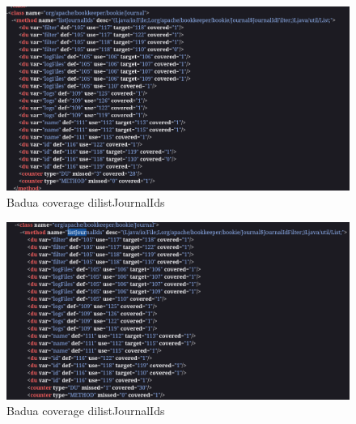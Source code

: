 \documentclass[12pt, a4paper]{article}
\begin{document}
  \begin{figure}
    \includegraphics[width=\linewidth]{./images/BaduaCoveragelistJournalIds1.png}
    \caption{Badua coverage dilistJournalIds}
    \label{fig:listJournalIds_badua}
  \end{figure}

  \begin{figure}
    \includegraphics[width=\linewidth]{./images/BaduaCoveragelistJournalIds2.png}
    \caption{Badua coverage dilistJournalIds}
    \label{fig:listJournalIds_badua2}
  \end{figure}
\end{document}
